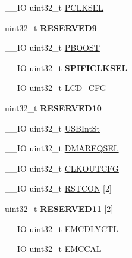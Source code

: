 \begin{DoxyCompactItemize}
\item 
\+\_\+\+\_\+\+I\+O uint32\+\_\+t \hyperlink{struct_l_p_c___s_y_s_c_t_l___t_a55111e26d098f9e4ee0dbfd5b243a014}{P\+C\+L\+K\+S\+E\+L}
\item 
\hypertarget{struct_l_p_c___s_y_s_c_t_l___t_a12fa7b1279b627ede2d98fc594ef12e8}{uint32\+\_\+t {\bfseries R\+E\+S\+E\+R\+V\+E\+D9}}\label{struct_l_p_c___s_y_s_c_t_l___t_a12fa7b1279b627ede2d98fc594ef12e8}

\item 
\+\_\+\+\_\+\+I\+O uint32\+\_\+t \hyperlink{struct_l_p_c___s_y_s_c_t_l___t_acc912b84bbe8dc170fdf50300d341acb}{P\+B\+O\+O\+S\+T}
\item 
\hypertarget{struct_l_p_c___s_y_s_c_t_l___t_a8b3afcd7f261d6efbaa9756a14b2172f}{\+\_\+\+\_\+\+I\+O uint32\+\_\+t {\bfseries S\+P\+I\+F\+I\+C\+L\+K\+S\+E\+L}}\label{struct_l_p_c___s_y_s_c_t_l___t_a8b3afcd7f261d6efbaa9756a14b2172f}

\item 
\+\_\+\+\_\+\+I\+O uint32\+\_\+t \hyperlink{struct_l_p_c___s_y_s_c_t_l___t_aef5d629c590fd35e8da2e061ddcdf17e}{L\+C\+D\+\_\+\+C\+F\+G}
\item 
\hypertarget{struct_l_p_c___s_y_s_c_t_l___t_a98f4753990deb2f55da89740b07b0c71}{uint32\+\_\+t {\bfseries R\+E\+S\+E\+R\+V\+E\+D10}}\label{struct_l_p_c___s_y_s_c_t_l___t_a98f4753990deb2f55da89740b07b0c71}

\item 
\+\_\+\+\_\+\+I\+O uint32\+\_\+t \hyperlink{struct_l_p_c___s_y_s_c_t_l___t_a0505fe464c77b1421ebbd8f9d1cd9f2a}{U\+S\+B\+Int\+St}
\item 
\+\_\+\+\_\+\+I\+O uint32\+\_\+t \hyperlink{struct_l_p_c___s_y_s_c_t_l___t_a1915d9b403571a380a581c82352b8e4a}{D\+M\+A\+R\+E\+Q\+S\+E\+L}
\item 
\+\_\+\+\_\+\+I\+O uint32\+\_\+t \hyperlink{struct_l_p_c___s_y_s_c_t_l___t_aebd09c67da35ee48eb53ef129aa2b76e}{C\+L\+K\+O\+U\+T\+C\+F\+G}
\item 
\+\_\+\+\_\+\+I\+O uint32\+\_\+t \hyperlink{struct_l_p_c___s_y_s_c_t_l___t_ae7fbeba7b7acf3f7759d1de9eaf39ea1}{R\+S\+T\+C\+O\+N} \mbox{[}2\mbox{]}
\item 
\hypertarget{struct_l_p_c___s_y_s_c_t_l___t_a48f144f097b79ab5a32878b62eb34c1b}{uint32\+\_\+t {\bfseries R\+E\+S\+E\+R\+V\+E\+D11} \mbox{[}2\mbox{]}}\label{struct_l_p_c___s_y_s_c_t_l___t_a48f144f097b79ab5a32878b62eb34c1b}

\item 
\+\_\+\+\_\+\+I\+O uint32\+\_\+t \hyperlink{struct_l_p_c___s_y_s_c_t_l___t_a3976afa12c3ebc2e7acfe59aef82acc4}{E\+M\+C\+D\+L\+Y\+C\+T\+L}
\item 
\+\_\+\+\_\+\+I\+O uint32\+\_\+t \hyperlink{struct_l_p_c___s_y_s_c_t_l___t_aa7c40eaca1081f3133eda04395be6fa6}{E\+M\+C\+C\+A\+L}
\end{DoxyCompactItemize}


